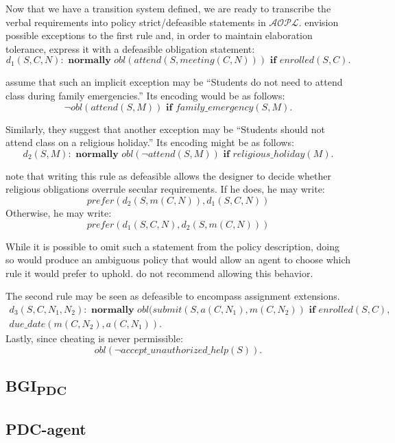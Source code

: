 Now that we have a transition system defined, we are ready to transcribe the verbal requirements into policy strict/defeasible statements in $\mathcal{AOPL}$.
\citet{gelfond_authorization_2008} envision possible exceptions to the first rule and, in order to maintain elaboration tolerance, express it with a defeasible obligation statement:
\[
d_1(S,C,N): \textbf{ normally } obl(attend(S, meeting(C, N))) \textbf{ if } enrolled(S, C).
\]

\citet{gelfond_authorization_2008} assume that such an implicit exception may be ``Students do not need to attend class during family emergencies.''
Its encoding would be as follows:
\[
\neg obl(attend(S,M)) \textbf{ if } family\_emergency(S,M).
\]

Similarly, they suggest that another exception may be ``Students should not attend class on a religious holiday.''
Its encoding might be as follows:
\[
d_2(S,M): \textbf{ normally } obl(\neg attend(S, M)) \textbf{ if } religious\_holiday(M).
\]

\citet{gelfond_authorization_2008} note that writing this rule as defeasible allows the designer to decide whether religious obligations overrule secular requirements.
If he does, he may write:
\[
prefer(d_2(S, m(C,N)),d_1(S,C,N))
\]
Otherwise, he may write:
\[
prefer(d_1(S,C,N), d_2(S, m(C,N)))
\]

While it is possible to omit such a statement from the policy description, doing so would produce an ambiguous policy that would allow an agent to choose which rule it would prefer to uphold.
\citet{gelfond_authorization_2008} do not recommend allowing this behavior.

The second rule may be seen as defeasible to encompass assignment extensions.
\begin{multline*}
    d_3(S,C,N_1,N_2): \textbf{ normally } obl(submit(S,a(C,N_1),m(C,N_2)) \textbf{ if } enrolled(S,C), \\
        due\_date(m(C,N_2), a(C,N_1)).
\end{multline*}
Lastly, since cheating is never permissible:
\[
obl(\neg accept\_unauthorized\_help(S)).
\]





\subsection{\texorpdfstring{BGI\textsubscript{PDC}}{BGI-PDC}}

\subsection{PDC-agent}
